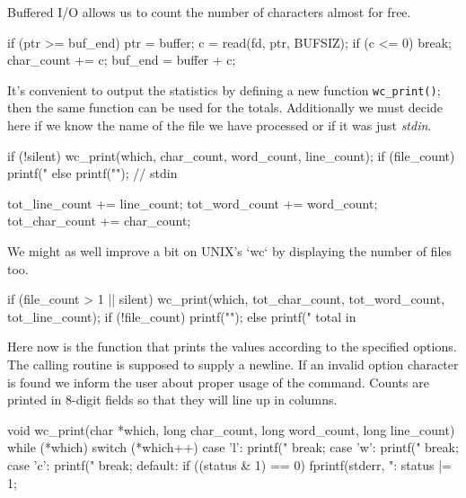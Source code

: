\documentclass[11pt,a4paper]{article}
\begin{document}
Buffered I/O allows us to count the number of characters almost for free.

\begin{code}[name={Fill buffer if it is empty; break at end of file}]
if (ptr >= buf_end) {
    ptr = buffer;
    c = read(fd, ptr, BUFSIZ);
    if (c <= 0) break;
    char_count += c;
    buf_end = buffer + c;
}
\end{code}

It's convenient to output the statistics by defining a new function \texttt{wc\_print()}; then the same
function can be used for the totals. Additionally we must decide here if we know the name of the
file we have processed or if it was just \emph{stdin}.

\begin{code}[name={Write statistics for file}]
if (!silent) {
    wc_print(which, char_count, word_count, line_count);
    if (file_count) printf(" %
    else printf("\n");                       // stdin
}
\end{code}

\begin{code}[name={Update grand totals}]
tot_line_count += line_count;
tot_word_count += word_count;
tot_char_count += char_count;
\end{code}

We might as well improve a bit on UNIX's `wc` by displaying the number of files too.

\begin{code}[name={Print the grand totals if there were multiple files}]
if (file_count > 1 || silent) {
    wc_print(which, tot_char_count, tot_word_count, tot_line_count);
    if (!file_count) printf("\n");
    else printf(" total in %
}
\end{code}

Here now is the function that prints the values according to the specified options. The calling
routine is supposed to supply a newline. If an invalid option character is found we inform the user
about proper usage of the command. Counts are printed in 8-digit fields so that they will line up in
columns.

\begin{code}[name={Functions}]
void wc_print(char *which, long char_count, long word_count, long line_count)
{
    while (*which)
        switch (*which++) {
        case 'l': printf("%
            break;
        case 'w': printf("%
            break;
        case 'c': printf("%
            break;
        default:
            if ((status & 1) == 0) {
                fprintf(stderr, "\nUsage: %
                status |= 1;
            }
        }
}
\end{code}
\end{document}
